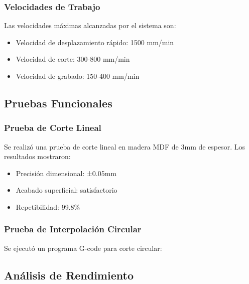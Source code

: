 \documentclass[12pt]{article}
\begin{document}
\subsubsection{Velocidades de Trabajo}

Las velocidades máximas alcanzadas por el sistema son:
\begin{itemize}
    \item Velocidad de desplazamiento rápido: 1500 mm/min
    \item Velocidad de corte: 300-800 mm/min
    \item Velocidad de grabado: 150-400 mm/min
\end{itemize}

\subsection{Pruebas Funcionales}

\subsubsection{Prueba de Corte Lineal}

Se realizó una prueba de corte lineal en madera MDF de 3mm de espesor. Los resultados mostraron:
\begin{itemize}
    \item Precisión dimensional: ±0.05mm
    \item Acabado superficial: satisfactorio
    \item Repetibilidad: 99.8\%
\end{itemize}

\subsubsection{Prueba de Interpolación Circular}

Se ejecutó un programa G-code para corte circular:


\subsection{Análisis de Rendimiento}
\end{document}
